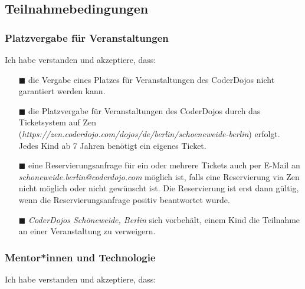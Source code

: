 \documentclass{coderdojoschoeneweide}
\begin{document}
\begin{Form}

\newpage

\part*{Teilnahmebedingungen}

	\section*{Platzvergabe für Veranstaltungen}
	
	Ich habe verstanden und akzeptiere, dass:

	\begin{itemize}
		\item[$\blacksquare$] die Vergabe eines Platzes für Veranstaltungen des CoderDojos nicht garantiert werden kann. 
		\item[$\blacksquare$] die Platzvergabe für Veranstaltungen des CoderDojos durch das Ticketsystem auf Zen \\(\textit{https://zen.coderdojo.com/dojos/de/berlin/schoeneweide-berlin}) erfolgt. Jedes Kind ab 7 Jahren benötigt ein eigenes Ticket. 
		\item[$\blacksquare$] eine Reservierungsanfrage für ein oder mehrere Tickets auch per E-Mail an \textit{schoneweide.berlin@coderdojo.com} möglich ist, falls eine Reservierung via Zen nicht möglich oder nicht gewünscht ist. Die Reservierung ist erst dann gültig, wenn die Reservierungsanfrage positiv beantwortet wurde.
		\item[$\blacksquare$] \textit{CoderDojos Schöneweide, Berlin} sich vorbehält, einem Kind die Teilnahme an einer Veranstaltung zu verweigern.
	\end{itemize}

	\section*{Mentor*innen und Technologie}

	Ich habe verstanden und akzeptiere, dass:


\end{Form}
\end{document}
